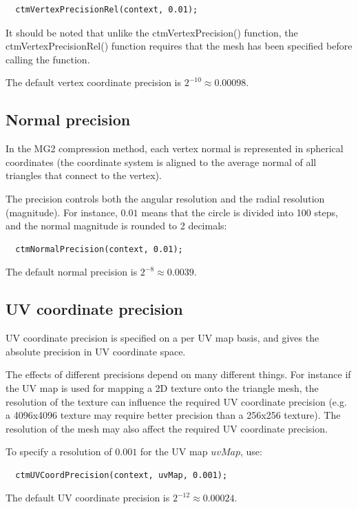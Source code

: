 \begin{lstlisting}
  ctmVertexPrecisionRel(context, 0.01);
\end{lstlisting}

It should be noted that unlike the ctmVertexPrecision() function, the
ctmVertexPrecisionRel() function requires that the mesh has been specified
before calling the function.

The default vertex coordinate precision is $2^{-10} \approx 0.00098$.


\subsection{Normal precision}
In the MG2 compression method, each vertex normal is represented in spherical
coordinates (the coordinate system is aligned to the average normal of all
triangles that connect to the vertex).

The precision controls both the angular resolution and the radial resolution
(magnitude). For instance, $0.01$ means that the circle is divided into 100
steps, and the normal magnitude is rounded to 2 decimals:

\begin{lstlisting}
  ctmNormalPrecision(context, 0.01);
\end{lstlisting}

The default normal precision is $2^{-8} \approx 0.0039$.


\subsection{UV coordinate precision}
UV coordinate precision is specified on a per UV map basis, and
gives the absolute precision in UV coordinate space.

The effects of different precisions depend on many different things. For
instance if the UV map is used for mapping a 2D texture onto the triangle
mesh, the resolution of the texture can influence the required UV
coordinate precision (e.g. a 4096x4096 texture may require better
precision than a 256x256 texture). The resolution of the mesh may also
affect the required UV coordinate precision.

To specify a resolution of $0.001$ for the UV map $uvMap$, use:

\begin{lstlisting}
  ctmUVCoordPrecision(context, uvMap, 0.001);
\end{lstlisting}

The default UV coordinate precision is $2^{-12} \approx 0.00024$.


